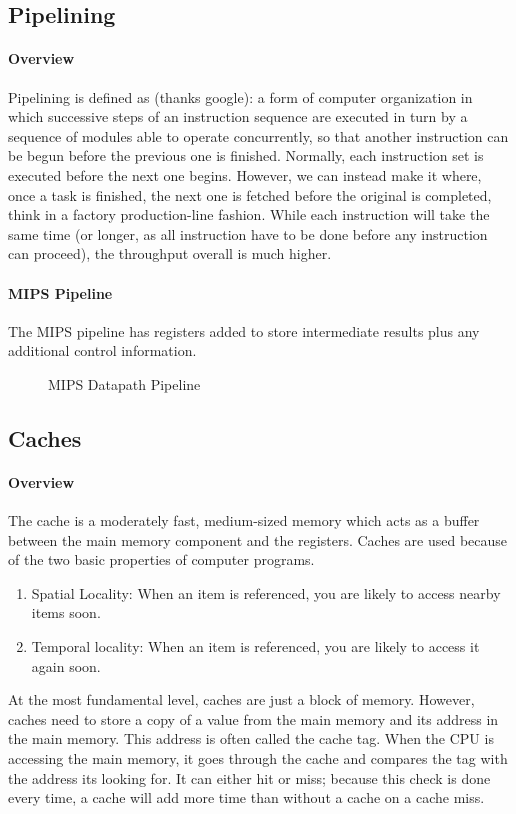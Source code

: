 \subsection{Pipelining}
\paragraph{Overview}
Pipelining is defined as (thanks google): a form of computer organization in which successive steps of an instruction sequence are executed in turn by a sequence of modules able to operate concurrently, so that another instruction can be begun before the previous one is finished. Normally, each instruction set is executed before the next one begins. However, we can instead make it where, once a task is finished, the next one is fetched before the original is completed, think in a factory production-line fashion. While each instruction will take the same time (or longer, as all instruction have to be done before any instruction can proceed), the throughput overall is much higher.

\paragraph{MIPS Pipeline}
The MIPS pipeline has registers added to store intermediate results plus any additional control information.
 \begin{figure}[!htb]
	\caption{\label{fig:pipeline} MIPS Datapath Pipeline}
\end{figure}

\subsection{Caches}
\paragraph{Overview}The cache is a moderately fast, medium-sized memory which acts as a buffer between the main memory component and the registers. Caches are used because of the two basic properties of computer programs.
\begin{enumerate}
	\item Spatial Locality: When an item is referenced, you are likely to access nearby items soon.
	\item Temporal locality: When an item is referenced, you are likely to access it again soon.
\end{enumerate}
At the most fundamental level, caches are just a block of memory. However, caches need to store a copy of a value from the main memory and its address in the main memory. This address is often called the cache tag. When the CPU is accessing the main memory, it goes through the cache and compares the tag with the address its looking for. It can either hit or miss; because this check is done every time, a cache will add more time than without a cache on a cache miss.

